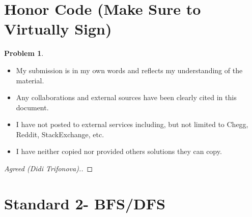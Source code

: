 \documentclass[11pt]{article}
\theoremstyle{definition}
\theoremstyle{definition}
\newtheorem{required}{Problem}
\theoremstyle{definition}
\begin{document}
\section{Honor Code (Make Sure to Virtually Sign)} \label{HonorCode}

\begin{required}
\begin{itemize}
\item My submission is in my own words and reflects my understanding of the material.
\item Any collaborations and external sources have been clearly cited in this document.
\item I have not posted to external services including, but not limited to Chegg, Reddit, StackExchange, etc.
\item I have neither copied nor provided others solutions they can copy.
\end{itemize}

\end{required}

\begin{proof}[Agreed (Didi Trifonova).]
\end{proof}


\newpage
\section{Standard 2- BFS/DFS}
\end{document}
